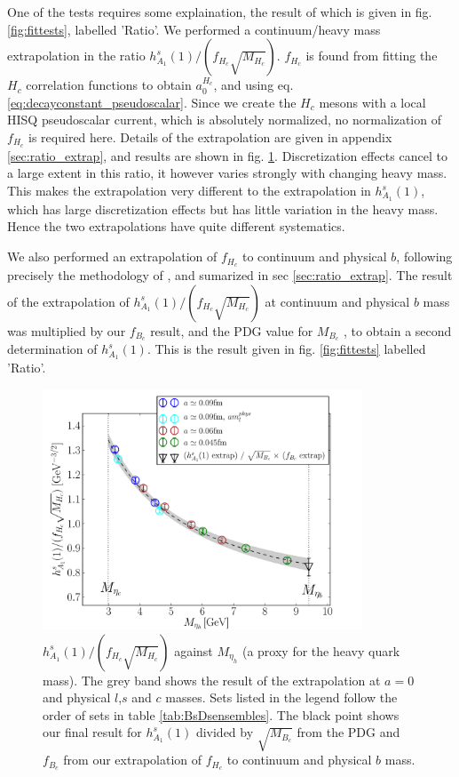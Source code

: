 One of the tests requires some explaination, the result of which is given in fig. \ref{fig:fittests}, labelled 'Ratio'. We performed a continuum/heavy mass extrapolation in the ratio $h_{A_1}^s(1)/(f_{H_c}\sqrt{M_{H_c}})$. $f_{H_c}$ is found from fitting the $H_c$ correlation functions to obtain $a_0^{H_c}$, and using eq. \eqref{eq:decayconstant_pseudoscalar}. Since we create the $H_c$ mesons with a local HISQ pseudoscalar current, which is absolutely normalized, no normalization of $f_{H_c}$ is required here. Details of the extrapolation are given in appendix \ref{sec:ratio_extrap}, and results are shown in fig. \ref{fig:fHc}. Discretization effects cancel to a large extent in this ratio, it however varies strongly with changing heavy mass. This makes the extrapolation very different to the extrapolation in $h_{A_1}^s(1)$, which has large discretization effects but has little variation in the heavy mass. Hence the two extrapolations have quite different systematics.

We also performed an extrapolation of $f_{H_c}$ to continuum and physical $b$, following precisely the methodology of \cite{McNeile:2012qf}, and sumarized in sec \ref{sec:ratio_extrap}. The result of the extrapolation of $h_{A_1}^s(1)/(f_{H_c}\sqrt{M_{H_c}})$ at continuum and physical $b$ mass was multiplied by our $f_{B_c}$ result, and the PDG value for $M_{B_c}$ \cite{PhysRevD.98.030001}, to obtain a second determination of $h_{A_1}^s(1)$. This is the result given in fig. \ref{fig:fittests} labelled 'Ratio'.

\begin{figure}[htb!]
  \begin{center}
  \hspace{-10pt}
  \includegraphics[width=0.85\textwidth]{images/BsDsstar/hA1overfHc.pdf}
  \caption{ $h_{A_1}^s(1)/(f_{H_c}\sqrt{M_{H_c}})$ against $M_{\eta_h}$ (a proxy for the heavy quark mass). The grey band shows the result of the extrapolation at $a=0$ and physical $l$,$s$ and $c$ masses. Sets listed in the legend follow the order of sets in table \ref{tab:BsDsensembles}. The black point shows our final result for $h_{A_1}^s(1)$ divided by $\sqrt{M_{B_c}}$ from the PDG \cite{PhysRevD.98.030001} and $f_{B_c}$ from our extrapolation of $f_{H_c}$ to continuum and physical $b$ mass. \label{fig:fHc}}
  \end{center}
\end{figure}

